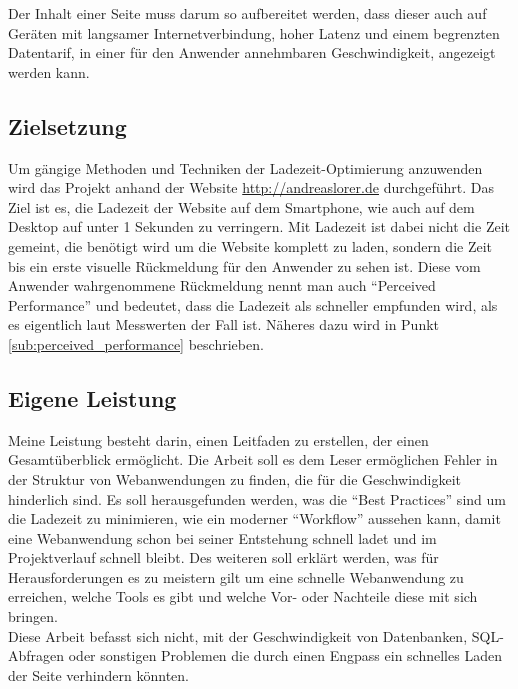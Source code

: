 		Der Inhalt einer Seite muss darum so aufbereitet werden, dass dieser auch auf Geräten mit langsamer Internetverbindung, hoher Latenz und einem begrenzten Datentarif, in einer für den Anwender annehmbaren Geschwindigkeit, angezeigt werden kann.\\



	\subsection{Zielsetzung} %
	\label{sub:zielsetzung}
		Um gängige Methoden und Techniken der Ladezeit-Optimierung anzuwenden wird das Projekt anhand der Website \url{http://andreaslorer.de} durchgeführt. Das Ziel ist es, die Ladezeit der Website auf dem Smartphone, wie auch auf dem Desktop auf unter 1 Sekunden zu verringern. Mit Ladezeit ist dabei nicht die Zeit gemeint, die benötigt wird um die Website komplett zu laden, sondern die Zeit bis ein erste visuelle Rückmeldung für den Anwender zu sehen ist. Diese vom Anwender wahrgenommene Rückmeldung nennt man auch "`Perceived Performance"' und bedeutet, dass die Ladezeit als schneller empfunden wird, als es eigentlich laut Messwerten der Fall ist. Näheres dazu wird in Punkt \ref{sub:perceived_performance} beschrieben.\\


	\subsection{Eigene Leistung} %
	\label{sub:eigene_leistung}

		Meine Leistung besteht darin, einen Leitfaden zu erstellen, der einen Gesamtüberblick ermöglicht. Die Arbeit soll es dem Leser ermöglichen Fehler in der Struktur von Webanwendungen zu finden, die für die Geschwindigkeit hinderlich sind.
		Es soll herausgefunden werden, was die "`Best Practices"' sind um die Ladezeit zu minimieren, wie ein moderner "`Workflow"' aussehen kann, damit eine Webanwendung schon bei seiner Entstehung schnell ladet und im Projektverlauf schnell bleibt. Des weiteren soll erklärt werden, was für Herausforderungen es zu meistern gilt um eine schnelle Webanwendung zu erreichen, welche Tools es gibt und welche Vor- oder Nachteile diese mit sich bringen.\\
		Diese Arbeit befasst sich nicht, mit der Geschwindigkeit von Datenbanken, SQL-Abfragen oder sonstigen Problemen die durch einen Engpass ein schnelles Laden der Seite verhindern könnten.

